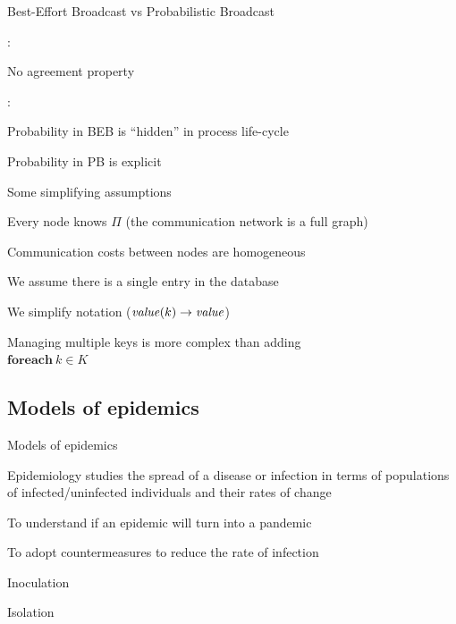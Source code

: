 \begin{frame}{Best-Effort Broadcast vs Probabilistic Broadcast}

:

\BI
\item No agreement property
\EI

:

\BI
\item Probability in BEB is “hidden” in process life-cycle
\item Probability in PB is explicit	
\EI
	
\end{frame}	

\begin{frame}{Some simplifying assumptions}

\BIL
\item Every node knows $\Pi$ (the communication network is a full graph)
\item Communication costs between nodes are homogeneous
\item We assume there is a single entry in the database
 \BI
  \item We simplify notation ($\mathit{value}(k) \rightarrow \mathit{value}$)
  \item Managing multiple keys is more complex than adding \\
   $\textbf{foreach}\ k \in K$
 \EI
\EIL

\bigskip
{}

\end{frame}

	
\subsection{Models of epidemics}
	
\begin{frame}{Models of epidemics}
	
\begin{definition}[Epidemiology]
\alert{Epidemiology} studies the spread of a disease or infection in terms of populations 
of infected/uninfected individuals and their rates of change
\end{definition}

\bigskip
{}
\BI
\item To understand if an epidemic will turn into a pandemic
\item To adopt countermeasures to reduce the rate of infection
 \BI
 \item Inoculation
 \item Isolation
 \EI
\EI

\end{frame}

